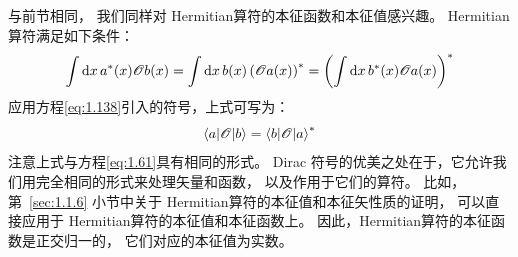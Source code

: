 与前节相同，
我们同样对 Hermitian算符的本征函数和本征值感兴趣。
Hermitian算符满足如下条件：
\begin{equation}
 \int\mathrm{d}x\,a^\ast(x)\mathscr{O}b(x) = \int\mathrm{d}x\,b(x)\left(\mathscr{O}a(x)\right)^\ast = \left(\int\mathrm{d}x\,b^\ast(x)\mathscr{O}a(x)\right)^\ast
 \label{eq:1.139}
\end{equation}
应用方程\eqref{eq:1.138}引入的符号，上式可写为：
\begin{equation}
 \left\langle a\middle\vert \mathscr{O} \middle\vert b\right\rangle = {\left\langle b\middle\vert \mathscr{O} \middle\vert a\right\rangle}^\ast
 \label{eq:1.140}
\end{equation}
注意上式与方程\eqref{eq:1.61}具有相同的形式。
Dirac 符号的优美之处在于，它允许我们用完全相同的形式来处理矢量和函数，
以及作用于它们的算符。
比如，第~\ref{sec:1.1.6} 小节中关于 Hermitian算符的本征值和本征矢性质的证明，
可以直接应用于 Hermitian算符的本征值和本征函数上。
因此，Hermitian算符的本征函数是正交归一的，
它们对应的本征值为实数。

